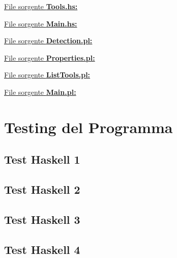 \documentclass{article}
\begin{document}
\underline{File sorgente \textbf{Tools.hs:}}


\lstset{inputencoding=utf8/latin1}
\underline{File sorgente \textbf{Main.hs:}}


\newpage
\raggedright
\underline{File sorgente \textbf{Detection.pl:}}


\underline{File sorgente \textbf{Properties.pl:}}


\underline{File sorgente \textbf{ListTools.pl:}}


\lstset{inputencoding=utf8/latin1}
\underline{File sorgente \textbf{Main.pl:}}

\newpage

\section{Testing del Programma}
\subsection*{Test Haskell 1}

\lstset{inputencoding=utf8/latin1}


\subsection*{Test Haskell 2}

\lstset{inputencoding=utf8/latin1}


\subsection*{Test Haskell 3}

\lstset{inputencoding=utf8/latin1}


\subsection*{Test Haskell 4}

\lstset{inputencoding=utf8/latin1}

\end{document}
